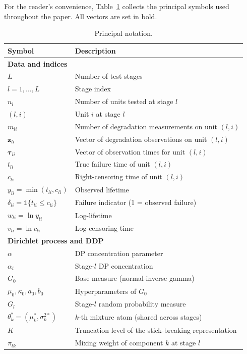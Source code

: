 \documentclass[a4paper,fleqn,longmktitle]{cas-sc}
\begin{document}
For the reader's convenience, Table~\ref{tab:notation} collects the principal symbols used throughout the paper. All vectors are set in bold.

\begin{table}
\centering
\caption{Principal notation.}
\label{tab:notation}
\begin{tabular}{ll}
\toprule
Symbol & Description \\
\midrule
\multicolumn{2}{l}{\textbf{Data and indices}} \\
$L$ & Number of test stages \\
$l = 1,\ldots,L$ & Stage index \\
$n_l$ & Number of units tested at stage $l$ \\
$(l,i)$ & Unit $i$ at stage $l$ \\
$m_{li}$ & Number of degradation measurements on unit $(l,i)$ \\
$\bm{z}_{li}$ & Vector of degradation observations on unit $(l,i)$ \\
$\bm{\tau}_{li}$ & Vector of observation times for unit $(l,i)$ \\
$t_{li}$ & True failure time of unit $(l,i)$ \\
$c_{li}$ & Right-censoring time of unit $(l,i)$ \\
$y_{li} = \min(t_{li}, c_{li})$ & Observed lifetime \\
$\delta_{li} = \mathbb{1}\{t_{li} \leq c_{li}\}$ & Failure indicator (1 = observed failure) \\
$w_{li} = \ln y_{li}$ & Log-lifetime \\
$v_{li} = \ln c_{li}$ & Log-censoring time \\
\midrule
\multicolumn{2}{l}{\textbf{Dirichlet process and DDP}} \\
$\alpha$ & DP concentration parameter \\
$\alpha_l$ & Stage-$l$ DP concentration \\
$G_0$ & Base measure (normal-inverse-gamma) \\
$\mu_0, \kappa_0, a_0, b_0$ & Hyperparameters of $G_0$ \\
$G_l$ & Stage-$l$ random probability measure \\
$\theta_k^* = (\mu_k^*, \sigma_k^{2*})$ & $k$-th mixture atom (shared across stages) \\
$K$ & Truncation level of the stick-breaking representation \\
$\pi_{lk}$ & Mixing weight of component $k$ at stage $l$ \\

\end{tabular}
\end{table}
\end{document}
